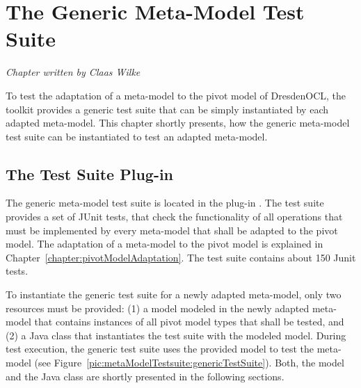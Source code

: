 \chapter{The Generic Meta-Model Test Suite}
\label{chapter:metaModelTestSuite}

\begin{flushright}
\textit{Chapter written by Claas Wilke}
\end{flushright}

To test the adaptation of a meta-model to the pivot model of DresdenOCL, the
toolkit provides a generic test suite that can be simply instantiated by each 
adapted meta-model. This chapter shortly presents, how the generic meta-model 
test suite can be instantiated to test an adapted meta-model.



\section{The Test Suite Plug-in}

The generic meta-model test suite is located in the plug-in 
. The test suite 
provides a set of JUnit tests, that check the functionality of all operations 
that must be implemented by every meta-model that shall be adapted to the pivot 
model. The adaptation of a meta-model to the pivot model is explained in 
Chapter~\ref{chapter:pivotModelAdaptation}. The test suite contains about 150
Junit tests.

To instantiate the generic test suite for a newly adapted meta-model, only two
resources must be provided: (1) a model modeled in the newly adapted meta-model 
that contains instances of all pivot model types that shall be tested, and (2) a
Java class that instantiates the test suite with the modeled model. During test 
execution, the generic test suite uses the provided model to test the meta-model
(see Figure~\ref{pic:metaModelTestsuite:genericTestSuite}). Both, the model and 
the Java class are shortly presented in the following sections.

